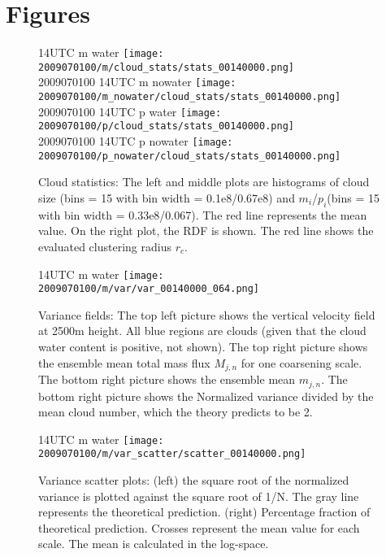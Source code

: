 \documentclass[a4paper, 12pt, draft]{article}
\begin{document}
\newpage
\section{Figures}


\begin{figure}[ht] \label{fig:case1_stats}
\noindent {} 14UTC m water
\texttt{[image: 2009070100/m/cloud\_stats/stats\_00140000.png]}\\
2009070100 14UTC m nowater
\texttt{[image: 2009070100/m\_nowater/cloud\_stats/stats\_00140000.png]}\\
2009070100 14UTC p water
\texttt{[image: 2009070100/p/cloud\_stats/stats\_00140000.png]}\\
2009070100 14UTC p nowater
\texttt{[image: 2009070100/p\_nowater/cloud\_stats/stats\_00140000.png]}\\
\caption{Cloud statistics: The left and middle plots are histograms of cloud size (bins = 15 with bin width = 0.1e8/0.67e8) and $m_i$/$p_i$(bins = 15 with bin width = 0.33e8/0.067). The red line represents the mean value. On the right plot, the RDF is shown. The red line shows the evaluated clustering radius $r_c$.}
\end{figure}

\begin{figure}[ht] \label{fig:case1_var_fields}
\noindent {} 14UTC m water
\texttt{[image: 2009070100/m/var/var\_00140000\_064.png]}\\
\caption{Variance fields:  The top left picture shows the vertical velocity field at 2500m height. All blue regions are clouds (given that the cloud water content is positive, not shown). The top right picture shows the ensemble mean total mass flux $M_{j,n}$ for one coarsening scale. The bottom right picture shows the ensemble mean $m_{j,n}$. The bottom right picture shows the Normalized variance divided by the mean cloud number, which the theory predicts to be 2.}
\end{figure}

\begin{figure}[ht] \label{fig:case1_var_scatter}
\noindent {} 14UTC m water
\texttt{[image: 2009070100/m/var\_scatter/scatter\_00140000.png]}\\
\caption{Variance scatter plots: (left) the square root of the normalized variance is plotted against the square root of 1/N. The gray line represents the theoretical prediction. (right) Percentage fraction of theoretical prediction. Crosses represent the mean value for each scale. The mean is calculated in the log-space.}
\end{figure}
\end{document}
